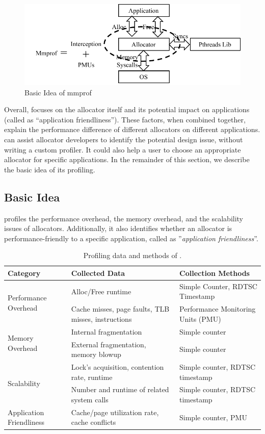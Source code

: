 \begin{figure}[!ht]
\centering
\includegraphics[width=5.5in]{figures/basicidea}
\caption{Basic Idea of mmprof\label{fig:basicidea}}
\end{figure}

Overall, \MP{} focuses on the allocator itself and its potential impact on applications (called as ``application friendliness''). These factors, when combined together, explain the performance difference of different allocators on different applications. \MP{} can assist allocator developers to identify the potential design issue, without writing a custom profiler. It could also help a user to choose an appropriate allocator for specific applications. In the remainder of this section, we describe the basic idea of its profiling. 

\subsection{Basic Idea}
\MP{} profiles the performance overhead, the memory overhead, and the scalability issues of allocators. Additionally, it also identifies whether an allocator is performance-friendly to a specific application, called as ''\textit{application friendliness}''.  


\begin{table}[h]
  \centering
  \footnotesize
\begin{tabular}{l | l | l}
\hline
Category & Collected Data & Collection Methods \\ \hline
\multirow{2}{*}{Performance Overhead} & {Alloc/Free runtime} & Simple Counter, RDTSC Timestamp\\ \cline{2-3}
& {Cache misses, page faults, TLB misses, instructions} & Performance Monitoring Units (PMU) \\ \hline
\multirow{2}{*}{Memory Overhead} & Internal fragmentation & Simple counter\\ \cline{2-3}
& {External fragmentation, memory blowup} & Simple counter \\ \hline
\multirow{2}{*}{Scalability} & Lock's acquisition, contention rate, runtime & Simple counter, RDTSC timestamp\\ \cline{2-3}
& {Number and runtime of related system calls} & Simple counter, RDTSC timestamp \\ \hline
{Application Friendliness} & Cache/page utilization rate, cache conflicts & Simple counter, PMU \\ \hline
  \end{tabular}
  \centering
  \caption{Profiling data and methods of \MP{}.\label{table:alldata}}
\end{table}


